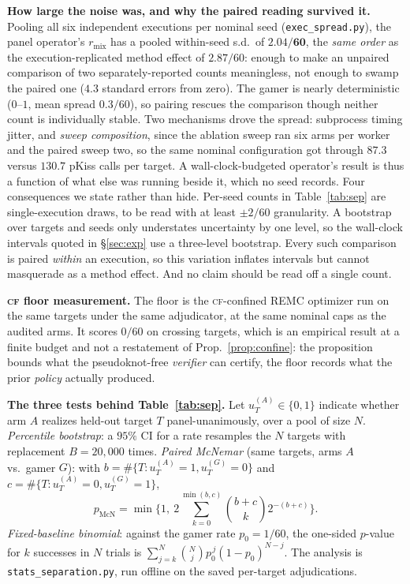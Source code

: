 \documentclass[11pt]{article}
\newcommand{\CF}{\textsc{cf}}
\begin{document}
\smallskip\noindent\textbf{How large the noise was, and why the paired reading survived it.} Pooling all six
independent executions per nominal seed (\texttt{exec\_spread.py}), the panel operator's $r_{\mathrm{mix}}$ has
a pooled within-seed s.d.\ of $\mathbf{2.04/60}$, the \emph{same order} as the execution-replicated method
effect of $2.87/60$: enough to make an unpaired comparison of two separately-reported counts meaningless, not
enough to swamp the paired one ($4.3$ standard errors from zero). The gamer is nearly deterministic ($0$--$1$, mean spread $0.3/60$), so pairing rescues the comparison though neither count is
individually stable. Two mechanisms drove the spread: subprocess timing jitter, and \emph{sweep composition},
since the ablation sweep ran six arms per worker and the paired sweep two, so the same nominal configuration got
through $87.3$ versus $130.7$ pKiss calls per target. A wall-clock-budgeted operator's result is thus a function
of what else was running beside it, which no seed records. Four consequences we state rather than hide.
Per-seed counts in Table~\ref{tab:sep} are single-execution draws, to be read with at least $\pm2/60$
granularity. A bootstrap over targets and seeds only understates uncertainty by one level, so the wall-clock
intervals quoted in \S\ref{sec:exp} use a three-level bootstrap. Every such comparison is paired \emph{within}
an execution, so this variation inflates intervals but cannot masquerade as a method effect. And no claim should
be read off a single count.

\smallskip\noindent\textbf{\CF{} floor measurement.} The floor is the \CF-confined REMC optimizer run on the
same targets under the same adjudicator, at the same nominal caps as the audited arms. It scores $0/60$ on
crossing targets, which is an empirical result at a finite budget and not a restatement of
Prop.~\ref{prop:confine}: the proposition bounds what the pseudoknot-free \emph{verifier} can certify, the
floor records what the prior \emph{policy} actually produced.

\smallskip\noindent\textbf{The three tests behind Table~\ref{tab:sep}.} Let $u^{(A)}_T\in\{0,1\}$ indicate
whether arm $A$ realizes held-out target $T$ panel-unanimously, over a pool of size $N$. \emph{Percentile
bootstrap}: a $95\%$ CI for a rate resamples the $N$ targets with replacement $B{=}20{,}000$ times.
\emph{Paired McNemar} (same targets, arms $A$ vs.\ gamer $G$): with
$b=\#\{T:u^{(A)}_T{=}1,u^{(G)}_T{=}0\}$ and $c=\#\{T:u^{(A)}_T{=}0,u^{(G)}_T{=}1\}$,
\begin{equation}\label{eq:mcnemar}
  p_{\mathrm{McN}}=\min\!\Big\{1,\ 2\!\!\sum_{k=0}^{\min(b,c)}\!\binom{b+c}{k}2^{-(b+c)}\Big\} .
\end{equation}
\emph{Fixed-baseline binomial}: against the gamer rate $p_0{=}1/60$, the one-sided $p$-value for $k$ successes
in $N$ trials is $\sum_{j=k}^{N}\binom{N}{j}p_0^{\,j}(1-p_0)^{N-j}$. The analysis is
\texttt{stats\_separation.py}, run offline on the saved per-target adjudications.
\end{document}
